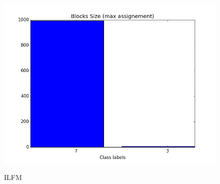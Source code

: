 \documentclass[a4paper, 12pt]{article}
\begin{document}
\begin{figure}[ht]
	\endminipage
	\includegraphics[scale=0.27]{img/expe/3_mmsb/figure_3}
	\endminipage

    \vspace{0.2cm}
	 ILFM


\end{figure}
\end{document}
